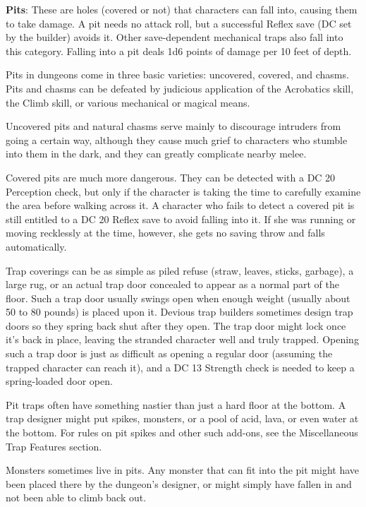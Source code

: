 \textbf{Pits}: These are holes (covered or not) that characters can fall into, causing them to take damage. A pit needs no attack roll, but a successful Reflex save (DC set by the builder) avoids it. Other save-dependent mechanical traps also fall into this category. Falling into a pit deals 1d6 points of damage per 10 feet of depth.
				
Pits in dungeons come in three basic varieties: uncovered, covered, and chasms. Pits and chasms can be defeated by judicious application of the Acrobatics skill, the Climb skill, or various mechanical or magical means.
				
Uncovered pits and natural chasms serve mainly to discourage intruders from going a certain way, although they cause much grief to characters who stumble into them in the dark, and they can greatly complicate nearby melee.
				
Covered pits are much more dangerous. They can be detected with a DC 20 Perception check, but only if the character is taking the time to carefully examine the area before walking across it. A character who fails to detect a covered pit is still entitled to a DC 20 Reflex save to avoid falling into it. If she was running or moving recklessly at the time, however, she gets no saving throw and falls automatically.
				
Trap coverings can be as simple as piled refuse (straw, leaves, sticks, garbage), a large rug, or an actual trap door concealed to appear as a normal part of the floor. Such a trap door usually swings open when enough weight (usually about 50 to 80 pounds) is placed upon it. Devious trap builders sometimes design trap doors so they spring back shut after they open. The trap door might lock once it's back in place, leaving the stranded character well and truly trapped. Opening such a trap door is just as difficult as opening a regular door (assuming the trapped character can reach it), and a DC 13 Strength check is needed to keep a spring-loaded door open.
				
Pit traps often have something nastier than just a hard floor at the bottom. A trap designer might put spikes, monsters, or a pool of acid, lava, or even water at the bottom. For rules on pit spikes and other such add-ons, see the Miscellaneous Trap Features section.
				
Monsters sometimes live in pits. Any monster that can fit into the pit might have been placed there by the dungeon's designer, or might simply have fallen in and not been able to climb back out. 
				
